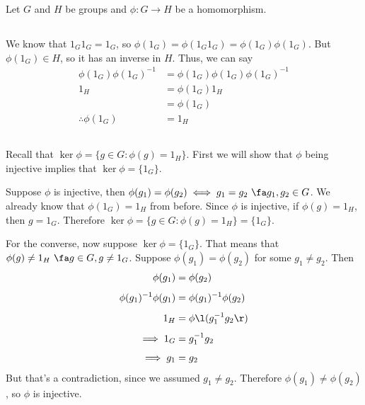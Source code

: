 \documentclass[a4paper]{article}
\begin{document}

Let $G$ and $H$ be groups and $\phi : G \to H$ be a homomorphism.

\subsection{}

We know that $1_G 1_G = 1_G$, so $\phi(1_G) = \phi(1_G 1_G) = \phi(1_G) \phi(1_G)$. But $\phi(1_G) \in H$, so it has an inverse in $H$. Thus, we can say \begin{align*}
	\phi(1_G) \phi(1_G)^{-1} &= \phi(1_G) \phi(1_G) \phi(1_G)^{-1}\\[1ex]
	1_H &= \phi(1_G) 1_H\\[1ex]
		&= \phi(1_G)\\[1ex]
	\therefore \phi(1_G) &= 1_H
\end{align*}

\subsection{}

Recall that $\ker \phi = \{g \in G : \phi(g) = 1_H\}$. First we will show that $\phi$ being injective implies that $\ker \phi = \{1_G\}$.

Suppose $\phi$ is injective, then $\phi(g_1) = \phi(g_2) \iff g_1 = g_2\ \fa g_1, g_2 \in G$. We already know that $\phi(1_G) = 1_H$ from before. Since $\phi$ is injective, if $\phi(g) = 1_H$, then $g = 1_G$. Therefore $\ker \phi = \{g \in G : \phi(g) = 1_H\} = \{1_G\}$.

For the converse, now suppose $\ker \phi = \{1_G\}$. That means that $\phi(g) \ne 1_H\ \fa g \in G, g \ne 1_G$. Suppose $\phi(g_1) = \phi(g_2)$ for some $g_1 \ne g_2$. Then \begin{align*}
	\phi(g_1) &= \phi(g_2)\\[1ex]
	\phi(g_1)^{-1} \phi(g_1) &= \phi(g_1)^{-1} \phi(g_2)\\[1ex]
	1_H &= \phi\l(g_1^{-1} g_2\r)\\[1ex]
	\implies 1_G &= g_1^{-1} g_2\\[1ex]
	\implies g_1 &= g_2
\end{align*}
But that's a contradiction, since we assumed $g_1 \ne g_2$. Therefore $\phi(g_1) \ne \phi(g_2)$, so $\phi$ is injective.

\subsection{}
\end{document}
